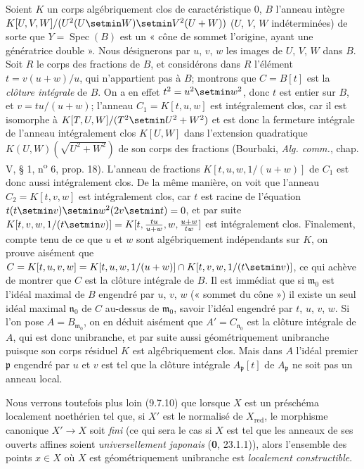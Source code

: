 Soient $K$ un corps algébriquement clos de caractéristique 0, $B$ l'anneau
intègre $K[U,V,W]/(U^2(U\setmin W)\setmin V^2(U+W))$
($U$, $V$, $W$ indéterminées) de sorte que $Y=\operatorname{Spec}(B)$ est
un « cône de sommet l'origine, ayant une génératrice double ». Nous
désignerons par $u$, $v$, $w$ les images de $U$, $V$, $W$ dans $B$. Soit
$R$ le corps des fractions de $B$, et considérons dans $R$ l'élément
$t=v(u+w)/u$, qui n'appartient pas à $B$; montrons que $C=B[t]$ est la
\emph{clôture intégrale} de $B$. On a en effet $t^2=u^2\setmin w^2$, donc $t$ est entier
sur $B$, et $v=tu/(u+w)$; l'anneau $C_1=K[t,u,w]$ est intégralement clos,
car il est isomorphe à
$K[T,U,W]/(T^2\setmin U^2+W^2)$ et est donc la fermeture intégrale de l'anneau
intégralement clos $K[U,W]$ dans l'extension quadratique
$K(U,W)(\sqrt{U^2+W^2})$ de son corps des fractions (Bourbaki, \emph{Alg. comm.},
chap. V, § 1, n\textsuperscript{o} 6, prop. 18). L'anneau de fractions
$K[t,u,w,1/(u+w)]$ de $C_1$ est donc aussi intégralement clos. De la même
manière, on voit que l'anneau $C_2=K[t,v,w]$ est intégralement clos, car
$t$ est racine de l'équation
$t(t\setmin v)\setmin w^2(2v\setmin t)=0$, et par suite
$K[t,v,w,1/(t\setmin v)]=K[t,\frac{tu}{u+w},w,\frac{u+w}{tw}]$ est intégralement clos. Finalement, compte tenu de ce
que $u$ et $w$ sont algébriquement indépendants sur $K$, on prouve aisément
que $C=K[t,u,v,w]=K[t,u,w,1/(u+w)]\cap K[t,v,w,1/(t\setmin v)]$,
ce qui achève de montrer que $C$ est la clôture intégrale de $B$. Il est
immédiat que si $\mathfrak m_0$ est l'idéal maximal de $B$ engendré par
$u$, $v$, $w$ (« sommet du cône ») il existe un seul idéal maximal
$\mathfrak n_0$ de $C$ au-dessus de $\mathfrak m_0$, savoir l'idéal
engendré par $t$, $u$, $v$, $w$. Si l'on pose $A=B_{\mathfrak m_0}$, on en
déduit aisément que $A'=C_{\mathfrak n_0}$ est la clôture intégrale de
$A$, qui est donc unibranche, et par suite aussi géométriquement unibranche
puisque son corps résiduel $K$ est algébriquement clos. Mais dans $A$
l'idéal premier $\mathfrak p$ engendré par $u$ et $v$ est tel que la
clôture intégrale $A_\mathfrak p[t]$ de $A_\mathfrak p$ ne soit pas un
anneau local.

Nous verrons toutefois plus loin (9.7.10) que lorsque $X$ est un préschéma
localement noethérien tel que, si $X'$ est le normalisé de
$X_{\mathrm{red}}$, le morphisme canonique $X'\to X$ soit \emph{fini} (ce qui sera
le cas si $X$ est tel que les anneaux de ses ouverts affines soient
\emph{universellement japonais} (\textbf{0}, 23.1.1)), alors l'ensemble des points $x\in X$
où $X$ est géométriquement unibranche est \emph{localement constructible}.

